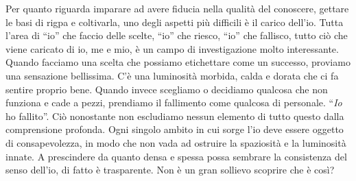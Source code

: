 Per quanto riguarda imparare ad avere fiducia nella qualità del conoscere, gettare le basi di rigpa e coltivarla, uno degli aspetti più difficili è il carico dell'io. Tutta l'area di ``io'' che faccio delle scelte, ``io'' che riesco, ``io'' che fallisco, tutto ciò che viene caricato di io, me e mio, è un campo di investigazione molto interessante. Quando facciamo una scelta che possiamo etichettare come un successo, proviamo una sensazione bellissima. C'è una luminosità morbida, calda e dorata che ci fa sentire proprio bene. Quando invece scegliamo o decidiamo qualcosa che non funziona e cade a pezzi, prendiamo il fallimento come qualcosa di personale. ``\textit{Io} ho fallito''. Ciò nonostante non escludiamo nessun elemento di tutto questo dalla comprensione profonda. Ogni singolo ambito in cui sorge l'io deve essere oggetto di consapevolezza, in modo che non vada ad ostruire la spaziosità e la luminosità innate. A prescindere da quanto densa e spessa possa sembrare la consistenza del senso dell'io, di fatto è trasparente. Non è un gran sollievo scoprire che è così?

